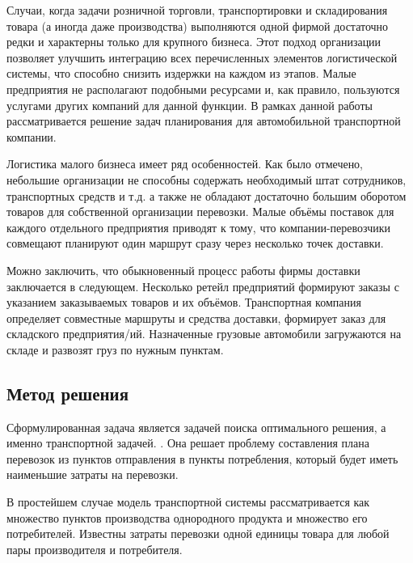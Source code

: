 Случаи, когда задачи розничной торговли, транспортировки и складирования товара (а иногда даже производства) выполняются одной фирмой достаточно редки и характерны только для крупного бизнеса. Этот подход организации позволяет улучшить интеграцию всех перечисленных элементов логистической системы, что способно снизить издержки на каждом из этапов. Малые предприятия не располагают подобными ресурсами и, как правило, пользуются услугами других компаний для данной функции. В рамках данной работы рассматривается решение задач планирования для автомобильной транспортной компании.

Логистика малого бизнеса имеет ряд особенностей\cite{subj:small_business}. Как было отмечено, небольшие организации не способны содержать необходимый штат сотрудников, транспортных средств и т.д. а также не обладают достаточно большим оборотом товаров для собственной организации перевозки. Малые объёмы поставок для каждого отдельного предприятия приводят к тому, что компании-перевозчики совмещают планируют один маршрут сразу через несколько точек доставки.

Можно заключить, что обыкновенный процесс работы фирмы доставки заключается в следующем. Несколько ретейл предприятий формируют заказы с указанием заказываемых товаров и их объёмов. Транспортная компания определяет совместные маршруты и средства доставки, формирует заказ для складского предприятия/ий. Назначенные грузовые автомобили загружаются на складе и развозят груз по нужным пунктам.

\subsection{Метод решения}
Сформулированная задача является задачей поиска оптимального решения, а именно транспортной задачей. \cite{trans:main}. Она решает проблему составления плана перевозок из пунктов отправления в пункты потребления, который будет иметь наименьшие затраты на перевозки. 

В простейшем случае модель транспортной системы рассматривается как множество пунктов производства однородного продукта и множество его потребителей. Известны затраты перевозки одной единицы товара для любой пары производителя и потребителя.

